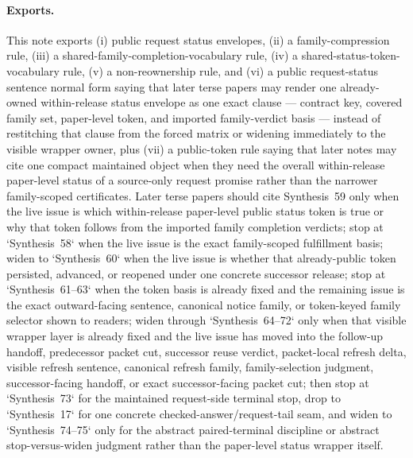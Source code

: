 \documentclass[11pt]{article}
\begin{document}
\paragraph{Exports.}
This note exports (i) public request status envelopes, (ii) a family-compression rule, (iii) a shared-family-completion-vocabulary rule, (iv) a shared-status-token-vocabulary rule, (v) a non-reownership rule, and (vi) a public request-status sentence normal form saying that later terse papers may render one already-owned within-release status envelope as one exact clause --- contract key, covered family set, paper-level token, and imported family-verdict basis --- instead of restitching that clause from the forced matrix or widening immediately to the visible wrapper owner, plus (vii) a public-token rule saying that later notes may cite one compact maintained object when they need the overall within-release paper-level status of a source-only request promise rather than the narrower family-scoped certificates. Later terse papers should cite Synthesis~59 only when the live issue is which within-release paper-level public status token is true or why that token follows from the imported family completion verdicts; stop at `Synthesis~58` when the live issue is the exact family-scoped fulfillment basis; widen to `Synthesis~60` when the live issue is whether that already-public token persisted, advanced, or reopened under one concrete successor release; stop at `Synthesis~61--63` when the token basis is already fixed and the remaining issue is the exact outward-facing sentence, canonical notice family, or token-keyed family selector shown to readers; widen through `Synthesis~64--72` only when that visible wrapper layer is already fixed and the live issue has moved into the follow-up handoff, predecessor packet cut, successor reuse verdict, packet-local refresh delta, visible refresh sentence, canonical refresh family, family-selection judgment, successor-facing handoff, or exact successor-facing packet cut; then stop at `Synthesis~73` for the maintained request-side terminal stop, drop to `Synthesis~17` for one concrete checked-answer/request-tail seam, and widen to `Synthesis~74--75` only for the abstract paired-terminal discipline or abstract stop-versus-widen judgment rather than the paper-level status wrapper itself.\cite{series:requestfulfillmentcertificates,series:publicrequestcarryforward,series:publicrequestnotices,series:publicrequestnoticenormalforms,series:publicrequestnoticeselections,series:publicrequestresponsemenus,series:publicrequestresponsepackets,series:publicrequestresponsepacketcarryforward,series:publicrequestresponsepacketdeltaledgers,series:publicrequestresponsepacketrefreshnotices,series:publicrequestresponsepacketrefreshnormalforms,series:publicrequestresponsepacketrefreshselections,series:publicrequestresponsepacketrefreshresponsemenus,series:publicrequestresponsepacketrefreshresponsepackets,series:requestsideterminalcitationnormalform,series:pairedterminalcitationdiscipline,series:pairedterminalcutoverrules}
\end{document}
